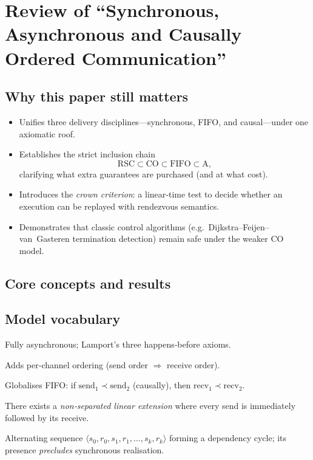 \section{Review of ``Synchronous, Asynchronous and Causally Ordered Communication''}


\subsection{Why this paper still matters}
\begin{itemize}
  \item Unifies three delivery disciplines—synchronous, FIFO, and causal—under one axiomatic roof.
  \item Establishes the strict inclusion chain
        \[
          \text{RSC} \subset \text{CO} \subset \text{FIFO} \subset \text{A},
        \]
        clarifying what extra guarantees are purchased (and at what cost).
  \item Introduces the \emph{crown criterion}: a linear‑time test to decide whether an execution can be replayed with rendezvous semantics.
  \item Demonstrates that classic control algorithms (e.g.\ Dijkstra–Feijen–van Gasteren termination detection) remain safe under the weaker CO model.
\end{itemize}

\subsection{Core concepts and results}

\subsection{Model vocabulary}
\begin{description}[leftmargin=*,style=nextline]
  \item[A‑computation] Fully asynchronous; Lamport’s three happens‑before axioms.
  \item[FIFO‑computation] Adds per‑channel ordering (send order $\Rightarrow$ receive order).
  \item[CO‑computation] Globalises FIFO: if $\text{send}_1 \prec \text{send}_2$ (causally), then $\text{recv}_1 \prec \text{recv}_2$.
  \item[RSC‑computation] There exists a \emph{non‑separated linear extension} where every send is immediately followed by its receive.
  \item[Crown] Alternating sequence $\langle s_0,r_0,s_1,r_1,\dots,s_k,r_k\rangle$ forming a dependency cycle; its presence \emph{precludes} synchronous realisation.
\end{description}


